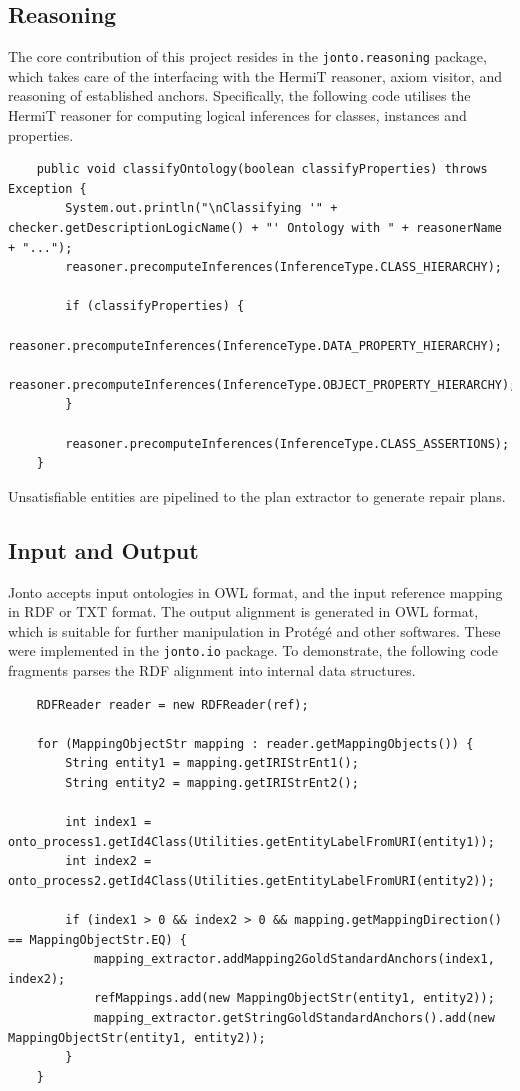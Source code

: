 \subsection{Reasoning}

The core contribution of this project resides in the \texttt{jonto.reasoning} package, which takes care of the interfacing with the HermiT reasoner, axiom visitor, and reasoning of established anchors. Specifically, the following code utilises the HermiT reasoner for computing logical inferences for classes, instances and properties.

\lstset{language=Java}
\begin{lstlisting}
    public void classifyOntology(boolean classifyProperties) throws Exception {
        System.out.println("\nClassifying '" + checker.getDescriptionLogicName() + "' Ontology with " + reasonerName + "...");
        reasoner.precomputeInferences(InferenceType.CLASS_HIERARCHY);

        if (classifyProperties) {
            reasoner.precomputeInferences(InferenceType.DATA_PROPERTY_HIERARCHY);
            reasoner.precomputeInferences(InferenceType.OBJECT_PROPERTY_HIERARCHY);
        }

        reasoner.precomputeInferences(InferenceType.CLASS_ASSERTIONS);
    }
\end{lstlisting}

Unsatisfiable entities are pipelined to the plan extractor to generate repair plans.

\subsection{Input and Output}

Jonto accepts input ontologies in OWL format, and the input reference mapping in RDF or TXT format. The output alignment is generated in OWL format, which is suitable for further manipulation in Protégé and other softwares. These were implemented in the \texttt{jonto.io} package. To demonstrate, the following code fragments parses the RDF alignment into internal data structures.

\lstset{language=Java}
\begin{lstlisting}
    RDFReader reader = new RDFReader(ref);

    for (MappingObjectStr mapping : reader.getMappingObjects()) {
        String entity1 = mapping.getIRIStrEnt1();
        String entity2 = mapping.getIRIStrEnt2();

        int index1 = onto_process1.getId4Class(Utilities.getEntityLabelFromURI(entity1));
        int index2 = onto_process2.getId4Class(Utilities.getEntityLabelFromURI(entity2));

        if (index1 > 0 && index2 > 0 && mapping.getMappingDirection() == MappingObjectStr.EQ) {
            mapping_extractor.addMapping2GoldStandardAnchors(index1, index2);
            refMappings.add(new MappingObjectStr(entity1, entity2));
            mapping_extractor.getStringGoldStandardAnchors().add(new MappingObjectStr(entity1, entity2));
        }
    }
\end{lstlisting}

